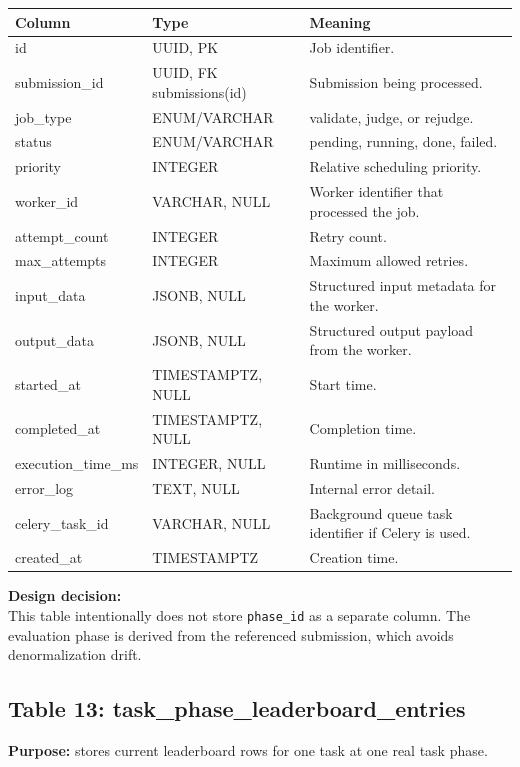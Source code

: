 \documentclass[11pt,a4paper]{article}
\begin{document}
\begin{longtable}{>{\raggedright\arraybackslash}p{} >{\raggedright\arraybackslash}p{} >{\raggedright\arraybackslash}p{}}
\toprule
\textbf{Column} & \textbf{Type} & \textbf{Meaning} \\
\midrule
id & UUID, PK & Job identifier. \\
submission\_id & UUID, FK submissions(id) & Submission being processed. \\
job\_type & ENUM/VARCHAR & validate, judge, or rejudge. \\
status & ENUM/VARCHAR & pending, running, done, failed. \\
priority & INTEGER & Relative scheduling priority. \\
worker\_id & VARCHAR, NULL & Worker identifier that processed the job. \\
attempt\_count & INTEGER & Retry count. \\
max\_attempts & INTEGER & Maximum allowed retries. \\
input\_data & JSONB, NULL & Structured input metadata for the worker. \\
output\_data & JSONB, NULL & Structured output payload from the worker. \\
started\_at & TIMESTAMPTZ, NULL & Start time. \\
completed\_at & TIMESTAMPTZ, NULL & Completion time. \\
execution\_time\_ms & INTEGER, NULL & Runtime in milliseconds. \\
error\_log & TEXT, NULL & Internal error detail. \\
celery\_task\_id & VARCHAR, NULL & Background queue task identifier if Celery is used. \\
created\_at & TIMESTAMPTZ & Creation time. \\
\bottomrule
\end{longtable}

\textbf{Design decision:}\\
This table intentionally does not store \texttt{phase\_id} as a separate column. The evaluation phase is derived from the referenced submission, which avoids denormalization drift.

\subsection{Table 13: task\_phase\_leaderboard\_entries}
\textbf{Purpose:} stores current leaderboard rows for one task at one real task phase.
\end{document}
